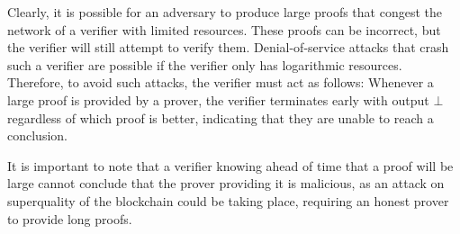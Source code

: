 \begin{remark}
Clearly, it is possible for an adversary to produce large proofs that congest
the network of a verifier with limited resources. These proofs can be incorrect,
but the verifier will still attempt to verify them. Denial-of-service attacks
that crash such a verifier are possible if the verifier only has logarithmic
resources. Therefore, to avoid such attacks, the verifier must act as follows:
Whenever a large proof is provided by a prover, the verifier terminates early
with output $\bot$ regardless of which proof is better, indicating that they are
unable to reach a conclusion.


It is important to note that a verifier knowing ahead of time that a proof will
be large cannot conclude that the prover providing it is malicious, as an attack
on superquality of the blockchain could be taking place, requiring an honest
prover to provide long proofs.
\end{remark}
